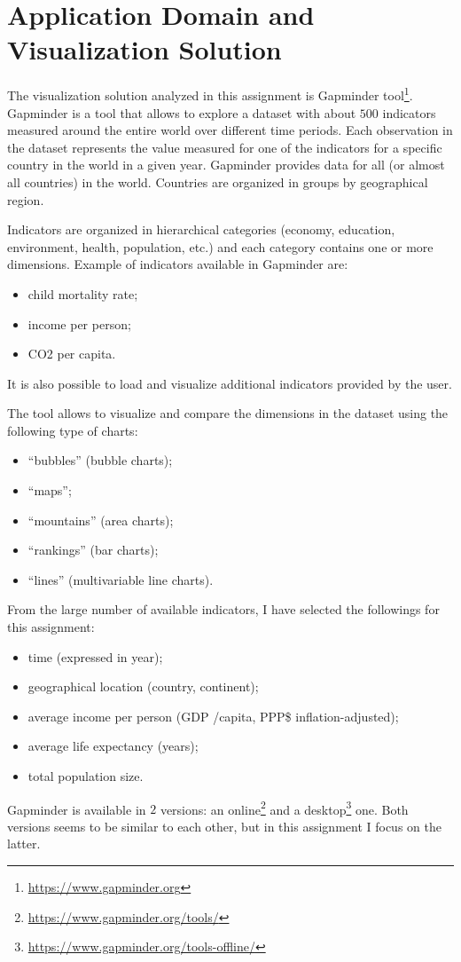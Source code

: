 \section{Application Domain and Visualization Solution}
\label{sec:visualization_solution}

The visualization solution analyzed in this assignment is Gapminder tool\footnote{\url{https://www.gapminder.org}}.
Gapminder is a tool that allows to explore a dataset with about $500$ indicators measured around the entire world over different time periods.
Each observation in the dataset represents the value measured for one of the indicators for a specific country in the world in a given year.
Gapminder provides data for all (or almost all countries) in the world.
Countries are organized in groups by geographical region.

Indicators are organized in hierarchical categories (economy, education, environment, health, population, etc.) and each category contains one or more dimensions.
Example of indicators available in Gapminder are:
\begin{itemize}
    \item child mortality rate;
    \item income per person;
    \item CO2 per capita.
\end{itemize}
It is also possible to load and visualize additional indicators provided by the user.

The tool allows to visualize and compare the dimensions in the dataset using the following type of charts:
\begin{itemize}
    \item ``bubbles'' (bubble charts);
    \item ``maps'';
    \item ``mountains'' (area charts);
    \item ``rankings'' (bar charts);
    \item ``lines'' (multivariable line charts).
\end{itemize}

\vspace{3mm}

From the large number of available indicators, I have selected the followings for this assignment:
\begin{itemize}
    \item time (expressed in year);
    \item geographical location (country, continent);
    \item average income per person (GDP /capita, PPP\$ inflation-adjusted);
    \item average life expectancy (years);
    \item total population size.
\end{itemize}

Gapminder is available in $2$ versions: an online\footnote{\url{https://www.gapminder.org/tools/}} and a desktop\footnote{\url{https://www.gapminder.org/tools-offline/}} one.
Both versions seems to be similar to each other, but in this assignment I focus on the latter.

